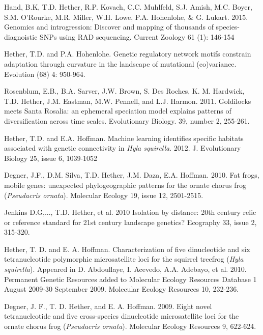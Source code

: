 \documentclass[letterpaper]{article}
\renewenvironment{itemize}{
  \begin{list}{}{
    \setlength{\leftmargin}{1.5em}
  }
}{
  \end{list}
}
\begin{document}
\begin{itemize}
\item Hand, B.K, T.D. Hether, R.P. Kovach, C.C. Muhlfeld, S.J. Amish, M.C. Boyer, S.M. O'Rourke, M.R. Miller, W.H. Lowe, P.A. Hohenlohe, \& G. Lukart. 2015. Genomics and introgression: Discover and mapping of thousands of species-diagnoistic SNPs using RAD sequencing.  Current Zoology 61 (1): 146-154

\item Hether, T.D. and P.A. Hohenlohe. Genetic regulatory network motifs constrain adaptation through curvature in the landscape of mutational (co)variance. Evolution (68) 4: 950-964.

\item Rosenblum, E.B., B.A. Sarver, J.W. Brown, S. Des Roches, K. M. Hardwick, T.D. Hether, J.M. Eastman, M.W. Pennell, and L.J. Harmon. 2011. Goldilocks meets Santa Rosalia: an ephemeral speciation model explains patterns of diversification across time scales. Evolutionary Biology. 39, number 2, 255-261.

\item Hether, T.D. and E.A. Hoffman. Machine learning identifies specific habitats associated with genetic connectivity in \emph{Hyla squirella}. 2012. J. Evolutionary Biology 25, issue 6, 1039-1052 

\item Degner, J.F., D.M. Silva, T.D. Hether, J.M. Daza, E.A. Hoffman. 2010. Fat frogs, mobile genes: unexpected phylogeographic patterns for the ornate chorus frog (\emph{Pseudacris ornata}). Molecular Ecology 19, issue 12, 2501-2515.

\item Jenkins D.G,..., T.D. Hether, et al. 2010  Isolation by distance: 20th century relic or reference standard for 21st century landscape genetics?  Ecography 33, issue 2, 315-320.

\item Hether, T. D. and E. A. Hoffman. Characterization of five dinucleotide and six tetranucleotide polymorphic microsatellite loci for the squirrel treefrog (\emph{Hyla squirella}).  Appeared in D. Abdoullaye, I. Acevedo, A.A. Adebayo, et al. 2010. Permanent Genetic Resources added to Molecular Ecology Resources Database 1 August 2009-30 September 2009. Molecular Ecology Resources 10, 232-236.

\item Degner, J. F., T. D. Hether, and E. A. Hoffman. 2009. Eight novel tetranucleotide and five cross-species dinucleotide microsatellite loci for the ornate chorus frog (\emph{Pseudacris ornata}). Molecular Ecology Resources 9, 622-624.


\end{itemize}
\end{document}
